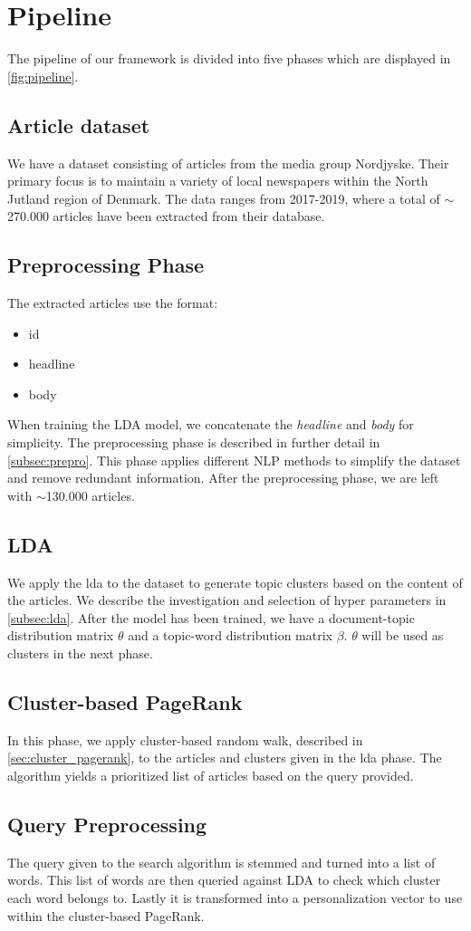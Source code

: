 \section{Pipeline}


The pipeline of our framework is divided into five phases which are displayed in \autoref{fig:pipeline}.

\subsection{Article dataset}
We have a dataset consisting of articles from the media group Nordjyske. Their primary focus is to maintain a variety of local newspapers within the North Jutland region of Denmark. 
The data ranges from 2017-2019, where a total of $\sim$270.000 articles have been extracted from their database.

\subsection{Preprocessing Phase}
The extracted articles use the format:
\begin{itemize}
	\item id
	\item headline
	\item body
\end{itemize}
When training the LDA model, we concatenate the \emph{headline} and \emph{body} for simplicity.
The preprocessing phase is described in further detail in \autoref{subsec:prepro}.
This phase applies different \gls{NLP} methods to simplify the dataset and remove redundant information.
After the preprocessing phase, we are left with $\sim$130.000 articles.

\subsection{LDA}
We apply the \acrfull{lda} to the dataset to generate topic clusters based on the content of the articles. 
We describe the investigation and selection of hyper parameters in \autoref{subsec:lda}. 
After the model has been trained, we have a document-topic distribution matrix $\theta$ and a topic-word distribution matrix $\beta$.
$\theta$ will be used as clusters in the next phase.

\subsection{Cluster-based PageRank}
In this phase, we apply cluster-based random walk, described in \autoref{sec:cluster_pagerank}, to the articles and clusters given in the \gls{lda} phase.
The algorithm yields a prioritized list of articles based on the query provided.


\subsection{Query Preprocessing}
The query given to the search algorithm is stemmed and turned into a list of words. 
This list of words are then queried against LDA to check which cluster each word belongs to.
Lastly it is transformed into a personalization vector to use within the cluster-based PageRank.
